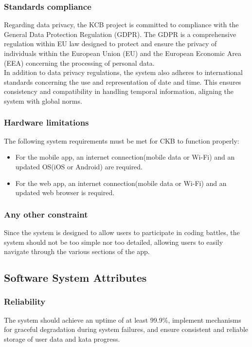 \documentclass{article}
\begin{document}
\subsubsection{Standards compliance}
Regarding data privacy, the KCB project is committed to compliance with the General Data Protection Regulation (GDPR). The GDPR is a comprehensive regulation within EU law designed to protect and ensure the privacy of individuals within the European Union (EU) and the European Economic Area (EEA) concerning the processing of personal data. \\
In addition to data privacy regulations, the system also adheres to international standards concerning the use and representation of date and time. This ensures consistency and compatibility in handling temporal information, aligning the system with global norms.

\subsubsection{Hardware limitations}
The following system requirements must be met for CKB to function properly:
\begin{itemize}
    \item For the mobile app, an internet connection(mobile data or Wi-Fi) and an updated OS(iOS or Android) are required. 
    \item For the web app, an internet connection(mobile data or Wi-Fi) and an updated web browser is required.
\end{itemize}

\subsubsection{Any other constraint}
Since the system is designed to allow users to participate in coding battles, the system should not be too simple nor too detailed, allowing users to easily navigate through the various sections of the app.

\subsection{Software System Attributes}

\subsubsection{Reliability}
The system should achieve an uptime of at least 99.9\%, implement mechanisms for graceful degradation during system failures, and ensure consistent and reliable storage of user data and kata progress.
\end{document}
